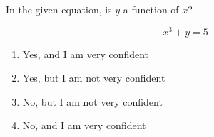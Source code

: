 \bigskip

\item In the given equation, is $y$ a function of $x$?

$$
x^3 + y = 5
$$

\begin{enumerate}
\item Yes, and I am very confident  
\item Yes, but I am not very confident
\item No, but I am not very confident
\item No, and I am very confident  
\end{enumerate}

